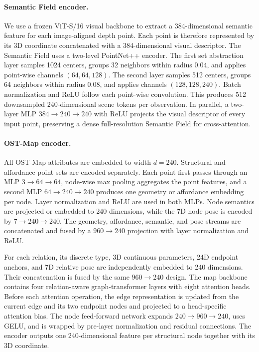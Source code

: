 \paragraph{Semantic Field encoder.}
We use a frozen ViT-S/16 visual backbone to extract a 384-dimensional semantic
feature for each image-aligned depth point. Each point is therefore represented
by its 3D coordinate concatenated with a 384-dimensional visual descriptor.
The Semantic Field uses a two-level PointNet++ encoder. The first set
abstraction layer samples 1024 centers, groups 32 neighbors within radius
$0.04$, and applies point-wise channels $(64,64,128)$. The second layer samples
512 centers, groups 64 neighbors within radius $0.08$, and applies channels
$(128,128,240)$. Batch normalization and ReLU follow each point-wise
convolution. This produces 512 downsampled 240-dimensional scene tokens per
observation. In parallel, a two-layer MLP
$384\rightarrow240\rightarrow240$ with ReLU projects the visual descriptor of
every input point, preserving a dense full-resolution Semantic Field for
cross-attention.

\paragraph{OST-Map encoder.}
All OST-Map attributes are embedded to width $d=240$. Structural and
affordance point sets are encoded separately. Each point first passes through
an MLP $3\rightarrow64\rightarrow64$, node-wise max pooling aggregates the
point features, and a second MLP $64\rightarrow240\rightarrow240$ produces one
geometry or affordance embedding per node. Layer normalization and ReLU are
used in both MLPs. Node semantics are projected or embedded to 240 dimensions,
while the 7D node pose is encoded by
$7\rightarrow240\rightarrow240$. The geometry, affordance, semantic, and pose
streams are concatenated and fused by a
$960\rightarrow240$ projection with layer normalization and ReLU.

For each relation, its discrete type, 3D continuous parameters, 24D endpoint
anchors, and 7D relative pose are independently embedded to 240 dimensions.
Their concatenation is fused by the same $960\rightarrow240$ design. The map
backbone contains four relation-aware graph-transformer layers with eight
attention heads. Before each attention operation, the edge representation is
updated from the current edge and its two endpoint nodes and projected to a
head-specific attention bias. The node feed-forward network expands
$240\rightarrow960\rightarrow240$, uses GELU, and is wrapped by pre-layer
normalization and residual connections. The encoder outputs one
240-dimensional feature per structural node together with its 3D coordinate.

